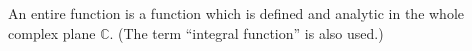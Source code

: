 An entire function is a function which is defined and analytic in the whole complex plane $\mathbb{C}$. (The term ``integral function'' is also used.)
